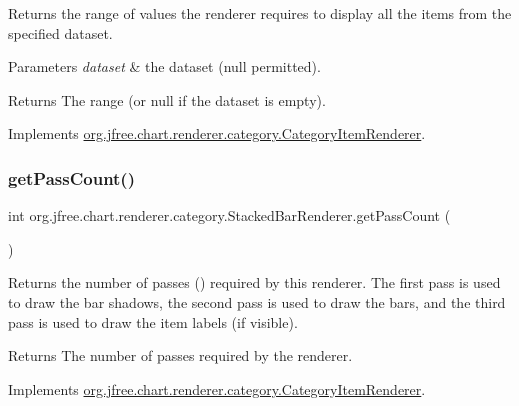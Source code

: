 Returns the range of values the renderer requires to display all the items from the specified dataset.


\begin{DoxyParams}{Parameters}
{\em dataset} & the dataset ({\ttfamily null} permitted).\\
\hline
\end{DoxyParams}
\begin{DoxyReturn}{Returns}
The range (or {\ttfamily null} if the dataset is empty). 
\end{DoxyReturn}


Implements \mbox{\hyperlink{interfaceorg_1_1jfree_1_1chart_1_1renderer_1_1category_1_1_category_item_renderer_aa7294c25a26ffd1725d7920a6041a785}{org.\+jfree.\+chart.\+renderer.\+category.\+Category\+Item\+Renderer}}.

\mbox{\label{classorg_1_1jfree_1_1chart_1_1renderer_1_1category_1_1_stacked_bar_renderer_a3c4c50f63e052eb83bf1ba4d3865a8a9}} 
\subsubsection{\texorpdfstring{get\+Pass\+Count()}{getPassCount()}}
{\footnotesize\ttfamily int org.\+jfree.\+chart.\+renderer.\+category.\+Stacked\+Bar\+Renderer.\+get\+Pass\+Count (\begin{DoxyParamCaption}{ }\end{DoxyParamCaption})}

Returns the number of passes ({}) required by this renderer. The first pass is used to draw the bar shadows, the second pass is used to draw the bars, and the third pass is used to draw the item labels (if visible).

\begin{DoxyReturn}{Returns}
The number of passes required by the renderer. 
\end{DoxyReturn}


Implements \mbox{\hyperlink{interfaceorg_1_1jfree_1_1chart_1_1renderer_1_1category_1_1_category_item_renderer_aa8cd580a0e3836808f97f479f2c999bc}{org.\+jfree.\+chart.\+renderer.\+category.\+Category\+Item\+Renderer}}.

